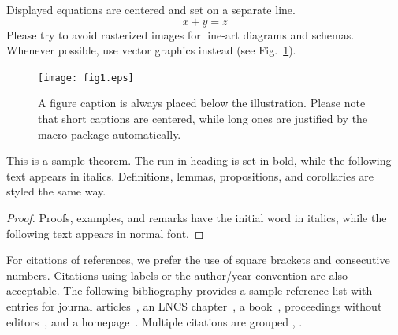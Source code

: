 \documentclass[runningheads]{llncs}
\begin{document}
{    \noindent Displayed equations are centered and set on a separate
    line.
    \begin{equation}
        x + y = z
    \end{equation}
    Please try to avoid rasterized images for line-art diagrams and
    schemas. Whenever possible, use vector graphics instead (see
    Fig.~\ref{fig1}).

    \begin{figure}
        \texttt{[image: fig1.eps]}
        \caption{A figure caption is always placed below the illustration.
        Please note that short captions are centered, while long ones are
        justified by the macro package automatically.} \label{fig1}
    \end{figure}

    \begin{theorem}
        This is a sample theorem. The run-in heading is set in bold, while
        the following text appears in italics. Definitions, lemmas,
        propositions, and corollaries are styled the same way.
    \end{theorem}
    \begin{proof}
        Proofs, examples, and remarks have the initial word in italics,
        while the following text appears in normal font.
    \end{proof}
    For citations of references, we prefer the use of square brackets
    and consecutive numbers. Citations using labels or the author/year
    convention are also acceptable. The following bibliography provides
    a sample reference list with entries for journal
    articles~\cite{ref_article1}, an LNCS chapter~\cite{ref_lncs1}, a
    book~\cite{ref_book1}, proceedings without editors~\cite{ref_proc1},
    and a homepage~\cite{ref_url1}. Multiple citations are grouped
    \cite{ref_article1,ref_lncs1,ref_book1},
    \cite{ref_article1,ref_book1,ref_proc1,ref_url1}.
    }




    
    
\end{document}
